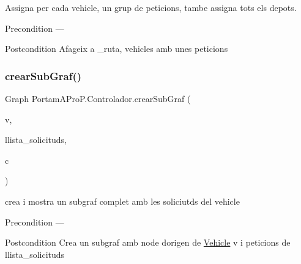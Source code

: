 Assigna per cada vehicle, un grup de peticions, tambe assigna tots els depots. 

\begin{DoxyPrecond}{Precondition}
--- 
\end{DoxyPrecond}
\begin{DoxyPostcond}{Postcondition}
Afageix a \+\_\+ruta, vehicles amb unes peticions 
\end{DoxyPostcond}
\mbox{\label{class_portam_a_pro_p_1_1_controlador_a2a8b7fc6a14913f1e5d1c046d1201c97}} 
\subsubsection{\texorpdfstring{crear\+Sub\+Graf()}{crearSubGraf()}}
{\footnotesize\ttfamily Graph Portam\+A\+Pro\+P.\+Controlador.\+crear\+Sub\+Graf (\begin{DoxyParamCaption}\item[{\hyperlink{class_portam_a_pro_p_1_1_vehicle}{Vehicle}}]{v,  }\item[{Tree\+Set$<$ \hyperlink{class_portam_a_pro_p_1_1_peticio}{Peticio} $>$}]{llista\+\_\+solicituds,  }\item[{int \mbox{[}$\,$\mbox{]}}]{c }\end{DoxyParamCaption})}



crea i mostra un subgraf complet amb les soliciutds del vehicle 

\begin{DoxyPrecond}{Precondition}
--- 
\end{DoxyPrecond}
\begin{DoxyPostcond}{Postcondition}
Crea un subgraf amb node d\textquotesingle{}origen de \hyperlink{class_portam_a_pro_p_1_1_vehicle}{Vehicle} v i peticions de llista\+\_\+solicituds 
\end{DoxyPostcond}
\mbox{\label{class_portam_a_pro_p_1_1_controlador_a74d0ce6ad481a89209bfe2ce15ce7233}} 
